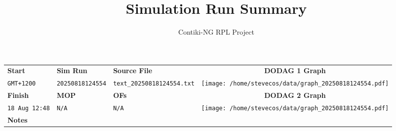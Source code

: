 \documentclass[a4paper, landscape]{article}
\begin{document}
\title{Simulation Run Summary}
\author{Contiki-NG RPL Project}
\maketitle


\begin{tabularx}{\textwidth}{|l|X|X|X|m{5.5cm}|}
\hline
\textbf{Start} & \textbf{Sim Run} & \textbf{Source File} & \multicolumn{2}{c|}{\textbf{DODAG 1 Graph}} \\
\texttt{GMT+1200} & \texttt{20250818124554} & \texttt{text\_20250818124554.txt} & \multicolumn{2}{c|}{\texttt{[image: /home/stevecos/data/graph\_20250818124554.pdf]}} \\
\hline
\textbf{Finish} & \textbf{MOP} & \textbf{OFs} & \multicolumn{2}{c|}{\textbf{DODAG 2 Graph}} \\
\texttt{18 Aug 12:48} & \texttt{N/A} & \texttt{N/A} & \multicolumn{2}{c|}{\texttt{[image: /home/stevecos/data/graph\_20250818124554.pdf]}} \\
\hline
\textbf{Notes} & \multicolumn{4}{l|}{} \\ %
\hline
\end{tabularx}
\vspace{1cm}
\end{document}
